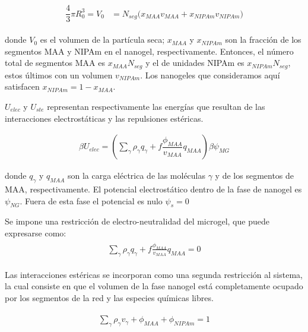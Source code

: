 	\begin{align}
		\begin{aligned} 
			\dfrac{4}{3}\pi R_0^3=V_0&=N_{seg}\Big( x_{MAA} v_{MAA} +x_{NIPAm} v_{NIPAm}\Big)
		\end{aligned}
	\end{align}
	
	
	\noindent donde $V_0$ es el volumen de la part\'icula seca; $x_{MAA}$ y $x_{NIPAm}$ son la fracci\'on de los segmentos MAA y NIPAm en el nanogel, respectivamente.
	Entonces, el n\'umero total de segmentos MAA es $x_{MAA}N_{seg}$ y el de unidades NIPAm es $x_{NIPAm}N_{seg}$, estos \'ultimos con un volumen $v_{NIPAm}$.
	Los nanogeles que consideramos aqu\'i satisfacen $x_{NIPAm}=1-x_{MAA}$.
	
	
	$U_{elec}$ y $U_{ste}$ representan respectivamente las energ\'ias que resultan de las interacciones electrost\'aticas y las repulsiones est\'ericas.
	
	\begin{align}
		\beta U_{elec} =\left(\sum_{\gamma } {\rho_\gamma q_\gamma + f\dfrac{\phi_{MAA}}{v_{MAA}}q_{MAA}}\right)\beta\psi_{MG}
	\end{align}
	
	\noindent donde $q_\gamma$ y $q_{MAA}$ son la carga el\'ectrica de las moléculas $\gamma$ y de los segmentos de MAA, respectivamente.
	El potencial electrost\'atico dentro de la fase de nanogel es $\psi_{NG}$. Fuera de esta fase el potencial es nulo $\psi_s = 0$
	
	Se impone una restricci\'on de electro-neutralidad del microgel, que puede expresarse como:
	\begin{align}
		\begin{aligned}
			\sum_{\gamma  } \rho_\gamma q_\gamma + f\frac{\phi_{MAA}}{v_{MAA}}q_{MAA}=0
		\end{aligned}
		\label{eq:mc:charge-neutrality}
	\end{align}
	
	Las interacciones est\'ericas se incorporan como una segunda restricci\'on al sistema, la cual consiste en que el volumen de la fase nanogel est\'a completamente ocupado por los segmentos de la red y las especies qu\'imicas libres.
	
	\begin{align}
		\begin{aligned}
			\sum_{\gamma } \rho_\gamma v_\gamma  + \phi_{MAA} + \phi_{NIPAm} = 1
		\end{aligned}
		\label{eq:mc:packing}
	\end{align}
	
